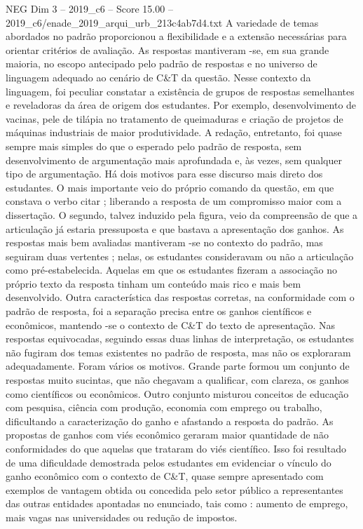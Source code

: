 \begin{textsample}{NEG Dim 3 – 2019\_c6 – Score 15.00 – 2019\_c6/enade\_2019\_arqui\_urb\_213c4ab7d4.txt}
A variedade de temas abordados no padrão proporcionou a flexibilidade e a extensão necessárias para orientar critérios de avaliação.
As respostas mantiveram -se, em sua grande maioria, no escopo antecipado pelo padrão de respostas e no universo de linguagem adequado ao cenário de C\&T da questão.
Nesse contexto da linguagem, foi peculiar constatar a existência de grupos de respostas semelhantes e reveladoras da área de origem dos estudantes.
Por exemplo, desenvolvimento de vacinas, pele de tilápia no tratamento de queimaduras e criação de projetos de máquinas industriais de maior produtividade.
A redação, entretanto, foi quase sempre mais simples do que o esperado pelo padrão de resposta, sem desenvolvimento de argumentação mais aprofundada e, às vezes, sem qualquer tipo de argumentação.
Há dois motivos para esse discurso mais direto dos estudantes.
O mais importante veio do próprio comando da questão, em que constava o verbo citar ; liberando a resposta de um compromisso maior com a dissertação.
O segundo, talvez induzido pela figura, veio da compreensão de que a articulação já estaria pressuposta e que bastava a apresentação dos ganhos.
As respostas mais bem avaliadas mantiveram -se no contexto do padrão, mas seguiram duas vertentes ; nelas, os estudantes consideravam ou não a articulação como pré-estabelecida.
Aquelas em que os estudantes fizeram a associação no próprio texto da resposta tinham um conteúdo mais rico e mais bem desenvolvido.
Outra característica das respostas corretas, na conformidade com o padrão de resposta, foi a separação precisa entre os ganhos científicos e econômicos, mantendo -se o contexto de C\&T do texto de apresentação.
Nas respostas equivocadas, seguindo essas duas linhas de interpretação, os estudantes não fugiram dos temas existentes no padrão de resposta, mas não os exploraram adequadamente.
Foram vários os motivos.
Grande parte formou um conjunto de respostas muito sucintas, que não chegavam a qualificar, com clareza, os ganhos como científicos ou econômicos.
Outro conjunto misturou conceitos de educação com pesquisa, ciência com produção, economia com emprego ou trabalho, dificultando a caracterização do ganho e afastando a resposta do padrão.
As propostas de ganhos com viés econômico geraram maior quantidade de não conformidades do que aquelas que trataram do viés científico.
Isso foi resultado de uma dificuldade demostrada pelos estudantes em evidenciar o vínculo do ganho econômico com o contexto de C\&T, quase sempre apresentado com exemplos de vantagem obtida ou concedida pelo setor público a representantes das outras entidades apontadas no enunciado, tais como : aumento de emprego, mais vagas nas universidades ou redução de impostos.

\end{textsample}
